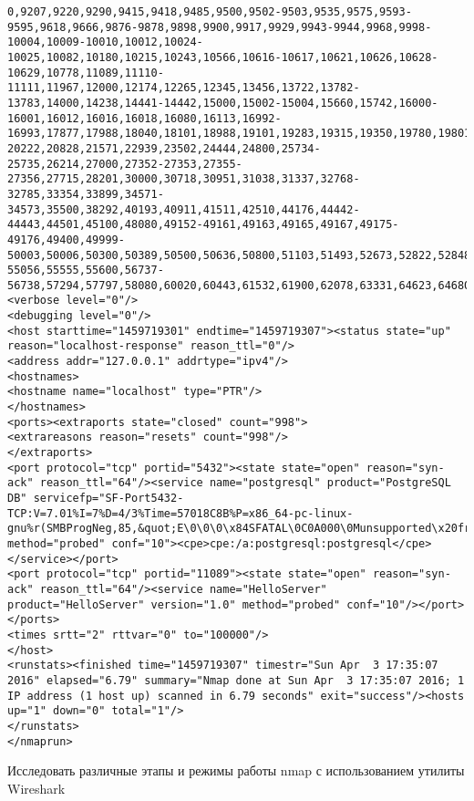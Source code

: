 \documentclass[12pt,a4paper]{report}
\begin{document}
\begin{verbatim}
0,9207,9220,9290,9415,9418,9485,9500,9502-9503,9535,9575,9593-9595,9618,9666,9876-9878,9898,9900,9917,9929,9943-9944,9968,9998-10004,10009-10010,10012,10024-10025,10082,10180,10215,10243,10566,10616-10617,10621,10626,10628-10629,10778,11089,11110-11111,11967,12000,12174,12265,12345,13456,13722,13782-13783,14000,14238,14441-14442,15000,15002-15004,15660,15742,16000-16001,16012,16016,16018,16080,16113,16992-16993,17877,17988,18040,18101,18988,19101,19283,19315,19350,19780,19801,19842,20000,20005,20031,20221-20222,20828,21571,22939,23502,24444,24800,25734-25735,26214,27000,27352-27353,27355-27356,27715,28201,30000,30718,30951,31038,31337,32768-32785,33354,33899,34571-34573,35500,38292,40193,40911,41511,42510,44176,44442-44443,44501,45100,48080,49152-49161,49163,49165,49167,49175-49176,49400,49999-50003,50006,50300,50389,50500,50636,50800,51103,51493,52673,52822,52848,52869,54045,54328,55055-55056,55555,55600,56737-56738,57294,57797,58080,60020,60443,61532,61900,62078,63331,64623,64680,65000,65129,65389"/>
<verbose level="0"/>
<debugging level="0"/>
<host starttime="1459719301" endtime="1459719307"><status state="up" reason="localhost-response" reason_ttl="0"/>
<address addr="127.0.0.1" addrtype="ipv4"/>
<hostnames>
<hostname name="localhost" type="PTR"/>
</hostnames>
<ports><extraports state="closed" count="998">
<extrareasons reason="resets" count="998"/>
</extraports>
<port protocol="tcp" portid="5432"><state state="open" reason="syn-ack" reason_ttl="64"/><service name="postgresql" product="PostgreSQL DB" servicefp="SF-Port5432-TCP:V=7.01%I=7%D=4/3%Time=57018C8B%P=x86_64-pc-linux-gnu%r(SMBProgNeg,85,&quot;E\0\0\0\x84SFATAL\0C0A000\0Munsupported\x20frontend\x20protocol\x2065363\.19778:\x20server\x20supports\x201\.0\x20to\x203\.0\0Fpostmaster\.c\0L1991\0RProcessStartupPacket\0\0&quot;);" method="probed" conf="10"><cpe>cpe:/a:postgresql:postgresql</cpe></service></port>
<port protocol="tcp" portid="11089"><state state="open" reason="syn-ack" reason_ttl="64"/><service name="HelloServer" product="HelloServer" version="1.0" method="probed" conf="10"/></port>
</ports>
<times srtt="2" rttvar="0" to="100000"/>
</host>
<runstats><finished time="1459719307" timestr="Sun Apr  3 17:35:07 2016" elapsed="6.79" summary="Nmap done at Sun Apr  3 17:35:07 2016; 1 IP address (1 host up) scanned in 6.79 seconds" exit="success"/><hosts up="1" down="0" total="1"/>
</runstats>
</nmaprun>
\end{verbatim}



Исследовать различные этапы и режимы работы nmap с использованием утилиты Wireshark
\end{document}
